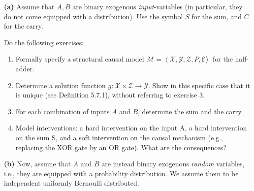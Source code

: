 \textbf{(a)} Assume that $A, B$ are binary exogenous \emph{input}-variables (in particular, they do not come equipped with a distribution). 
Use the symbol $S$ for the sum, and $C$ for the carry.

Do the following exercises:
\begin{enumerate}
  \item  Formally specify a structural causal model $\mathcal{M} = \left\langle \boldsymbol{\mathcal{X}}, \boldsymbol{\mathcal{Y}}, \boldsymbol{\mathcal{Z}}, P, \boldsymbol{f}\right\rangle$ for the half-adder.
  \item Determine a solution function $g: \boldsymbol{\mathcal{X}} \times \boldsymbol{\mathcal{Z}} \to \boldsymbol{\mathcal{Y}}$. Show in this specific case that it is unique (see Definition 5.7.1), without referring to exercise 3.
  \item For each combination of inputs $A$ and $B$, determine the sum and the carry.
  \item Model interventions: a hard intervention on the input A, a hard intervention on the sum S, and a soft intervention on the causal mechanism (e.g., replacing the XOR gate by an OR gate).
    What are the consequences? 
  \end{enumerate} 

  \textbf{(b)} Now, assume that $A$ and $B$ are instead binary exogenous \emph{random} variables, i.e., they are equipped with a probability distribution.
  We assume them to be independent uniformly Bernoulli distributed.


